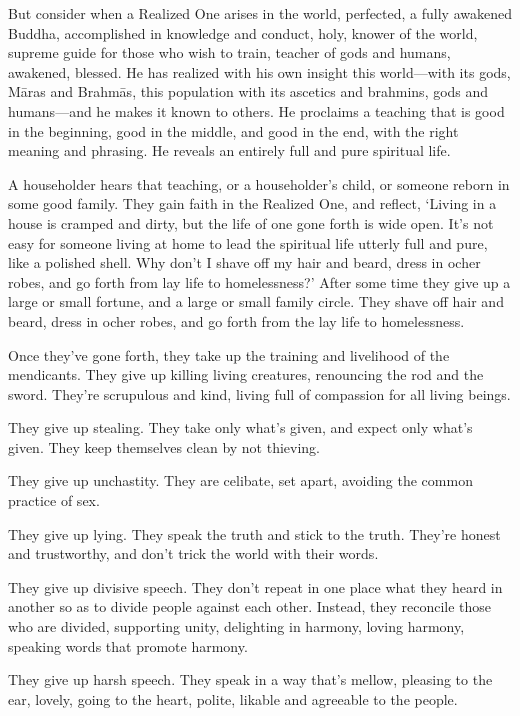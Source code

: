 \documentclass[12pt,openany]{book}%
\begin{document}
But consider when a Realized One arises in the world, perfected, a fully awakened Buddha, accomplished in knowledge and conduct, holy, knower of the world, supreme guide for those who wish to train, teacher of gods and humans, awakened, blessed. He has realized with his own insight this world—with its gods, \textsanskrit{Māras} and \textsanskrit{Brahmās}, this population with its ascetics and brahmins, gods and humans—and he makes it known to others. He proclaims a teaching that is good in the beginning, good in the middle, and good in the end, with the right meaning and phrasing. He reveals an entirely full and pure spiritual life. 

A householder hears that teaching, or a householder’s child, or someone reborn in some good family. They gain faith in the Realized One, and reflect, ‘Living in a house is cramped and dirty, but the life of one gone forth is wide open. It’s not easy for someone living at home to lead the spiritual life utterly full and pure, like a polished shell. Why don’t I shave off my hair and beard, dress in ocher robes, and go forth from lay life to homelessness?’ After some time they give up a large or small fortune, and a large or small family circle. They shave off hair and beard, dress in ocher robes, and go forth from the lay life to homelessness. 

Once they’ve gone forth, they take up the training and livelihood of the mendicants. They give up killing living creatures, renouncing the rod and the sword. They’re scrupulous and kind, living full of compassion for all living beings. 

They give up stealing. They take only what’s given, and expect only what’s given. They keep themselves clean by not thieving. 

They give up unchastity. They are celibate, set apart, avoiding the common practice of sex. 

They give up lying. They speak the truth and stick to the truth. They’re honest and trustworthy, and don’t trick the world with their words. 

They give up divisive speech. They don’t repeat in one place what they heard in another so as to divide people against each other. Instead, they reconcile those who are divided, supporting unity, delighting in harmony, loving harmony, speaking words that promote harmony. 

They give up harsh speech. They speak in a way that’s mellow, pleasing to the ear, lovely, going to the heart, polite, likable and agreeable to the people. 
\end{document}

